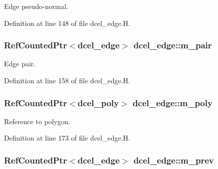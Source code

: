 Edge pseudo-\/normal. 



Definition at line 148 of file dcel\+\_\+edge.\+H.

\subsubsection[{\texorpdfstring{m\+\_\+pair}{m_pair}}]{\setlength{\rightskip}{0pt plus 5cm}Ref\+Counted\+Ptr$<${\bf dcel\+\_\+edge}$>$ dcel\+\_\+edge\+::m\+\_\+pair\hspace{0.3cm}{\ttfamily [protected]}}\hypertarget{classdcel__edge_a63193774b8173e4538f6301971377d35}{}\label{classdcel__edge_a63193774b8173e4538f6301971377d35}


Edge pair. 



Definition at line 158 of file dcel\+\_\+edge.\+H.

\subsubsection[{\texorpdfstring{m\+\_\+poly}{m_poly}}]{\setlength{\rightskip}{0pt plus 5cm}Ref\+Counted\+Ptr$<${\bf dcel\+\_\+poly}$>$ dcel\+\_\+edge\+::m\+\_\+poly\hspace{0.3cm}{\ttfamily [protected]}}\hypertarget{classdcel__edge_a2a7745d9e39c1162ad5d8af1f16c9b57}{}\label{classdcel__edge_a2a7745d9e39c1162ad5d8af1f16c9b57}


Reference to polygon. 



Definition at line 173 of file dcel\+\_\+edge.\+H.

\subsubsection[{\texorpdfstring{m\+\_\+prev}{m_prev}}]{\setlength{\rightskip}{0pt plus 5cm}Ref\+Counted\+Ptr$<${\bf dcel\+\_\+edge}$>$ dcel\+\_\+edge\+::m\+\_\+prev\hspace{0.3cm}{\ttfamily [protected]}}\hypertarget{classdcel__edge_a768565a1f3996c8c5d2db6a66203669b}{}\label{classdcel__edge_a768565a1f3996c8c5d2db6a66203669b}


